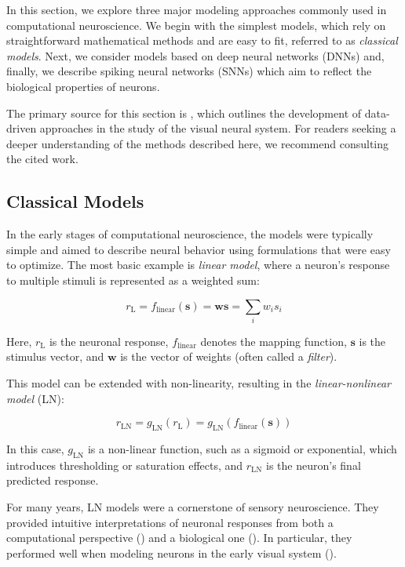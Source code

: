 In this section, we explore three major modeling approaches commonly used in computational neuroscience. We begin with the simplest models, which rely on straightforward mathematical methods and are easy to fit, referred to as \emph{classical models}. Next, we consider models based on deep neural networks (DNNs) and, finally, we describe spiking neural networks (SNNs) which aim to reflect the biological properties of neurons.

The primary source for this section is \citet{annurev:/content/journals/10.1146/annurev-vision-091718-014731}, which outlines the development of data-driven approaches in the study of the visual neural system. For readers seeking a deeper understanding of the methods described here, we recommend consulting the cited work.

\subsection{Classical Models}
\label{subsec:classical_approach}

In the early stages of computational neuroscience, the models were typically simple and aimed to describe neural behavior using formulations that were easy to optimize. The most basic example is \emph{linear model}, where a neuron's response to multiple stimuli is represented as a weighted sum:

$$r_{\text{L}} = f_{\text{linear}}(\boldsymbol{s}) = \boldsymbol{w}\boldsymbol{s} = \sum_{i} w_i s_i$$

Here, $r_{\text{L}}$ is the neuronal response, $f_{\text{linear}}$ denotes the mapping function, $\boldsymbol{s}$ is the stimulus vector, and $\boldsymbol{w}$ is the vector of weights (often called a \emph{filter}).

This model can be extended with non-linearity, resulting in the \emph{linear-nonlinear model} (LN):

$$r_{\text{LN}} = g_{\text{LN}}(r_{\text{L}}) = g_{\text{LN}}(f_{\text{linear}}(\boldsymbol{s}))$$

In this case, $g_{\text{LN}}$ is a non-linear function, such as a sigmoid or exponential, which introduces thresholding or saturation effects, and $r_{\text{LN}}$ is the neuron's final predicted response.

For many years, LN models were a cornerstone of sensory neuroscience. They provided intuitive interpretations of neuronal responses from both a computational perspective (\citet{hubel1965receptive, movshon1978receptive}) and a biological one (\citet{mohanty2012membrane, SHAPLEY2009907, poirazi2003pyramidal}). In particular, they performed well when modeling neurons in the early visual system (\citet{SHAPLEY2009907, baccus2002fast, Carandini10577}).

